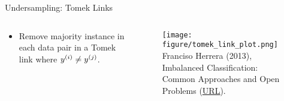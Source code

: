 \documentclass[11pt,compress,t,notes=noshow, xcolor=table]{beamer}
\begin{document}
\begin{frame}{Undersampling: Tomek Links}
{\begin{columns}
\begin{column}{0.7\textwidth}
\begin{itemize}
                \item Remove majority instance in each data pair in a Tomek link where $\yi \neq \yi[j]$.

                
                \end{itemize}		
            \end{column}
        
            \begin{column}{0.3\textwidth}
                \begin{figure}
                    \centering
                    \texttt{[image: figure/tomek\_link\_plot.png]}	
                    \tiny
                    \\ Franciso Herrera (2013), Imbalanced Classification: Common
                    Approaches and Open Problems (\href{https://sci2s.ugr.es/sites/default/files/files/TutorialsAndPlenaryTalks/SSTiC-Trends in-Classification-Imbalanced-data-sets.pdf}{\underline{URL}}).
                \end{figure}
            \end{column}
        \end{columns}
   }
\end{frame}


                
                


\end{document}
